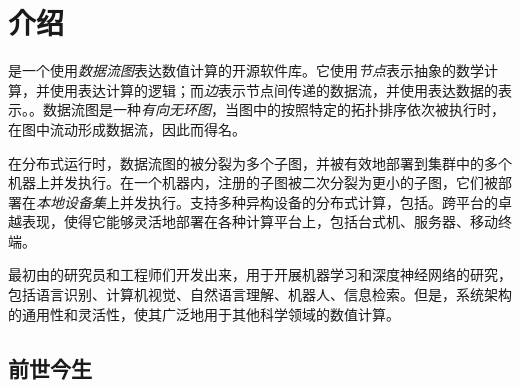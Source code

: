\begin{savequote}[45mm]
\end{savequote}

\chapter{介绍} 
\label{ch:introduction}

\begin{content}

\tf{}是一个使用\emph{数据流图}表达数值计算的开源软件库。它使用\emph{节点}表示抽象的数学计算，并使用表达计算的逻辑；而\emph{边}表示节点间传递的数据流，并使用表达数据的表示。。数据流图是一种\emph{有向无环图}，当图中的按照特定的拓扑排序依次被执行时，在图中流动形成数据流，\tf{}因此而得名。

在分布式运行时，数据流图的被分裂为多个子图，并被有效地部署到集群中的多个机器上并发执行。在一个机器内，注册的子图被二次分裂为更小的子图，它们被部署在\emph{本地设备集}上并发执行。\tf{}支持多种异构设备的分布式计算，包括。\tf{}跨平台的卓越表现，使得它能够灵活地部署在各种计算平台上，包括台式机、服务器、移动终端。

\tf{}最初由的研究员和工程师们开发出来，用于开展机器学习和深度神经网络的研究，包括语言识别、计算机视觉、自然语言理解、机器人、信息检索。但是，\tf{}系统架构的通用性和灵活性，使其广泛地用于其他科学领域的数值计算。

\end{content}

\section{前世今生}


